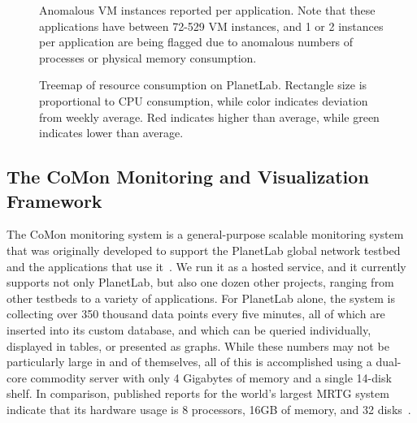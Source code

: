 \begin{figure*}[t]
\begin{minipage}[t]{3.5in}
\caption{Anomalous VM instances reported per application. Note that
these applications have between 72-529 VM instances, and 1 or 2 instances
per application are being flagged due to anomalous numbers of processes
or physical memory consumption.}
\label{fig_comon_anomaly}
\end{minipage}
\hspace{.25in}
\begin{minipage}[t]{2.75in}
\caption{Treemap of resource consumption on PlanetLab. Rectangle size
is proportional to CPU consumption, while color indicates deviation
from weekly average. Red indicates higher than average, while green
indicates lower than average.}
\label{fig_comon_treemap}
\end{minipage}
\end{figure*}

\subsection{The CoMon Monitoring and Visualization Framework}
\label{sec:comon}


The CoMon monitoring system is a general-purpose scalable monitoring
system that was originally developed to support the PlanetLab global
network testbed and the applications that use it~\cite{CoMon}. We run
it as a hosted service, and it currently supports not only PlanetLab,
but also one dozen other projects, ranging from other testbeds to a
variety of applications. For PlanetLab alone, the system is collecting
over 350 thousand data points every five minutes, all of which are
inserted into its custom database, and which can be queried
individually, displayed in tables, or presented as graphs. While these
numbers may not be particularly large in and of themselves, all of this
is accomplished using a dual-core commodity server with only 4
Gigabytes of memory and a single 14-disk shelf.
In comparison, published reports for the world's
largest MRTG system indicate that its hardware usage is 8 processors,
16GB of memory, and 32 disks~\cite{Plonka}.



